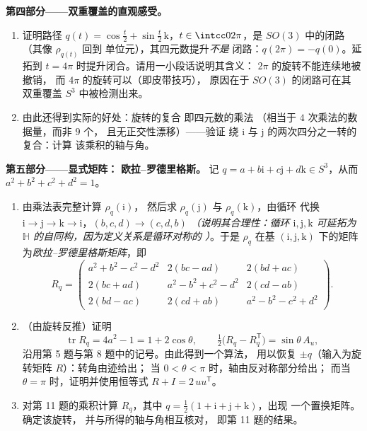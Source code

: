 \begin{problem}
\medskip
\noindent\textbf{第四部分——双重覆盖的直观感受。}
\begin{enumerate}[resume]
  \item 证明路径 $q(t) = \cos\frac t2 + \sin\frac
        t2\,\mathrm k$，$t \in \intcc0{2\pi}$，是 $SO(3)$ 中的闭路
        （其像 $\rho_{q(t)}$ 回到
        单位元），其四元数提升\emph{不是}
        闭路：$q(2\pi) = -q(0)$。延拓到 $t = 4\pi$
        时提升闭合。请用一小段话说明其含义：
        $2\pi$ 的旋转不能连续地被撤销，
        而 $4\pi$ 的旋转可以（即皮带技巧），
        原因在于 $SO(3)$ 的闭路可在其
        双重覆盖 $S^3$ 中被检测出来。
  \item 由此还得到实际的好处：旋转的复合
        即四元数的乘法
        （相当于 $4$ 次乘法的数据量，而非 $9$ 个，
        且无正交性漂移）——验证
        绕 $\mathrm i$ 与
        $\mathrm j$ 的两次四分之一转的复合：计算
        该乘积的轴与角。
\end{enumerate}

\medskip
\noindent\textbf{第五部分——显式矩阵：}
\textbf{欧拉--罗德里格斯。} 记 $q = a + b\mathrm i + c\mathrm j +
d\mathrm k \in S^3$，从而 $a^2 + b^2 + c^2 + d^2 = 1$。
\begin{enumerate}[resume]
  \item 由乘法表完整计算 $\rho_q(\mathrm i)$，
        然后求 $\rho_q(\mathrm
        j)$ 与 $\rho_q(\mathrm k)$，由循环
        代换 $\mathrm i \to \mathrm j \to \mathrm k
        \to \mathrm i$，$(b, c, d) \to (c, d, b)$
        \emph{（说明其合理性：循环 $\mathrm i, \mathrm j,
        \mathrm k$ 可延拓为 $\mathbb
        H$ 的自同构，因为定义关系是循环对称的
        ）}。于是 $\rho_q$ 在基
        $(\mathrm i, \mathrm j, \mathrm k)$ 下的矩阵
        为\emph{欧拉--罗德里格斯矩阵}，即
        \[
        R_q = \begin{pmatrix}
        a^2 + b^2 - c^2 - d^2 & 2(bc - ad) & 2(bd + ac)\\
        2(bc + ad) & a^2 - b^2 + c^2 - d^2 & 2(cd - ab)\\
        2(bd - ac) & 2(cd + ab) & a^2 - b^2 - c^2 + d^2
        \end{pmatrix}.
        \]
  \item （由旋转反推）证明
        \[
        \operatorname{tr}R_q = 4a^2 - 1 = 1 + 2\cos\theta,
        \qquad
        \tfrac12\bigl(R_q - R_q^{\mathsf T}\bigr) =
        \sin\theta\,A_u,
        \]
        沿用第 5 题与第 8 题中的记号。由此得到一个算法，
        用以恢复 $\pm q$（输入为旋转矩阵
        $R$）：转角由迹给出；
        当 $0 < \theta < \pi$ 时，轴由反对称部分给出；
        而当 $\theta = \pi$ 时，证明并使用恒等式 $R
        + I = 2\,uu^{\mathsf T}$。
  \item 对第 11 题的乘积计算 $R_q$，其中 $q =
        \frac12(1 + \mathrm i + \mathrm j + \mathrm k)$，出现
        一个置换矩阵。确定该旋转，
        并与所得的轴与角相互核对，
        即第 11 题的结果。
\end{enumerate}


\end{problem}
